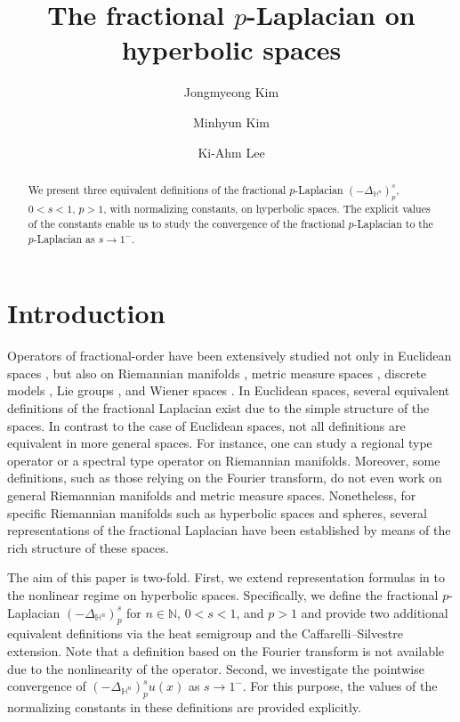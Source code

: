 \documentclass[11pt]{amsart}
\title[The fractional $p$-Laplacian on hyperbolic spaces]{The fractional $p$-Laplacian on hyperbolic spaces}
\author{Jongmyeong Kim}
\author{Minhyun Kim}
\author{Ki-Ahm Lee}
\theoremstyle{plain}
\theoremstyle{definition}
\numberwithin{equation}{section}
\begin{document}
\begin{abstract}
We present three equivalent definitions of the fractional $p$-Laplacian $(-\Delta_{\mathbb{H}^{n}})^{s}_{p}$, $0<s<1$, $p>1$, with normalizing constants, on hyperbolic spaces. The explicit values of the constants enable us to study the convergence of the fractional $p$-Laplacian to the $p$-Laplacian as $s \to 1^{-}$.
\end{abstract}

\maketitle


\section{Introduction} \label{sec:introduction}


Operators of fractional-order have been extensively studied not only in Euclidean spaces \cite{DNPV12}, but also on Riemannian manifolds \cite{AOCM18,BGS15,CG11,DNS19,Gon18,GZ03,GZZ18}, metric measure spaces \cite{CKK+22,CK08,FLW14,Gri03,GHL14}, discrete models \cite{CRS+18}, Lie groups \cite{CS17,CRT01,FF15,FMP+18}, and Wiener spaces \cite{CS17}. In Euclidean spaces, several equivalent definitions of the fractional Laplacian exist \cite{Kwa17} due to the simple structure of the spaces. In contrast to the case of Euclidean spaces, not all definitions are equivalent in more general spaces. For instance, one can study a regional type operator \cite{GZZ18} or a spectral type operator \cite{ST10} on Riemannian manifolds. Moreover, some definitions, such as those relying on the Fourier transform, do not even work on general Riemannian manifolds and metric measure spaces. Nonetheless, for specific Riemannian manifolds such as hyperbolic spaces and spheres, several representations of the fractional Laplacian have been established \cite{BGS15,DNS19} by means of the rich structure of these spaces.

The aim of this paper is two-fold. First, we extend representation formulas in \cite{BGS15} to the nonlinear regime on hyperbolic spaces. Specifically, we define the fractional $p$-Laplacian $(-\Delta_{\mathbb{H}^{n}})^{s}_{p}$ for $n \in \mathbb{N}$, $0 < s < 1$, and $p > 1$ and provide two additional equivalent definitions via the heat semigroup and the Caffarelli--Silvestre extension. Note that a definition based on the Fourier transform is not available due to the nonlinearity of the operator. Second, we investigate the pointwise convergence of $(-\Delta_{\mathbb{H}^{n}})^{s}_{p}u(x)$ as $s \to 1^{-}$. For this purpose, the values of the normalizing constants in these definitions are provided explicitly.
\end{document}
